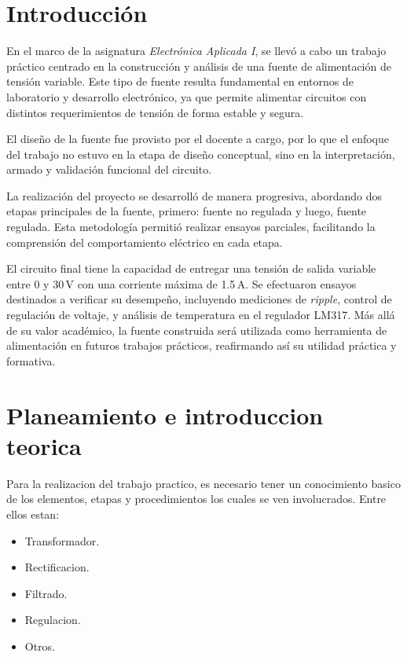 \documentclass[chaptersright]{informeutn}
\begin{document}
  \maketitle

  \tableofcontents
  \setcounter{page}{1}
  \thispagestyle{plain}

  \chapter{Introducción} 

    En el marco de la asignatura \textit{Electrónica Aplicada I}, se llevó a cabo un trabajo práctico centrado en la
    construcción y análisis de una fuente de alimentación de tensión variable. Este tipo de fuente resulta fundamental
    en entornos de laboratorio y desarrollo electrónico, ya que permite alimentar circuitos con distintos
    requerimientos de tensión de forma estable y segura.

    El diseño de la fuente fue provisto por el docente a cargo, por lo que el enfoque del trabajo no estuvo en la etapa
    de diseño conceptual, sino en la interpretación, armado y validación funcional del circuito.

    La realización del proyecto se desarrolló de manera progresiva, abordando dos etapas principales de la
    fuente, primero: fuente no regulada y luego, fuente regulada. Esta metodología permitió realizar ensayos parciales,
    facilitando la comprensión del comportamiento eléctrico en cada etapa.

    El circuito final tiene la capacidad de entregar una tensión de salida variable entre 0 y 30\,V con una corriente
    máxima de 1.5\,A. Se efectuaron ensayos destinados a verificar su desempeño, incluyendo mediciones de
    \textit{ripple}, control de regulación de voltaje, y análisis de temperatura en el regulador LM317. Más allá de su
    valor académico, la fuente construida será utilizada como herramienta de alimentación en futuros trabajos
    prácticos, reafirmando así su utilidad práctica y formativa.

  \chapter{Planeamiento e introduccion teorica}
    Para la realizacion del trabajo practico, es necesario tener un conocimiento basico de los elementos, etapas y
    procedimientos los cuales se ven involucrados. Entre ellos estan:
    \begin{itemize}
      \item Transformador.
      \item Rectificacion.
      \item Filtrado.
      \item Regulacion.
      \item Otros.
    \end{itemize}
\end{document}
